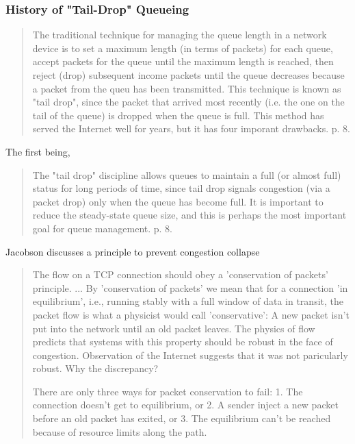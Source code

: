 \subsubsection{History of "Tail-Drop" Queueing}

\begin{quote}
The traditional technique for managing the queue length in a network device is to set a maximum
    length (in terms of packets) for each queue, accept packets for the queue until the maximum
    length is reached, then reject (drop) subsequent income packets until the queue decreases
    because a packet from the queu has been transmitted. This technique is known as "tail drop",
    since the packet that arrived most recently (i.e. the one on the tail of the queue) is dropped
    when the queue is full. This method has served the Internet well for years, but it has four
    imporant drawbacks. \cite{rfc7567} p. 8.
\end{quote}

The first being,

\begin{quote}
The "tail drop" discipline allows queues to maintain a full (or almost full) status for long periods
of time, since tail drop signals congestion (via a packet drop) only when the queue has become
full. It is important to reduce the steady-state queue size, and this is perhaps the most
important goal for queue management. \cite{rfc7567} p. 8.
\end{quote}


Jacobson \cite{jacobson1988} discusses a principle to prevent congestion collapse

\begin{quote}
    The flow on a TCP connection should obey a 'conservation of packets' principle. ... By
    'conservation of packets' we mean that for a connection 'in equilibrium', i.e., running stably
    with a full window of data in transit, the packet flow is what a physicist would call
    'conservative': A new packet isn't put into the network until an old packet leaves. The physics
    of flow predicts that systems with this property should be robust in the face of congestion.
    Observation of the Internet suggests that it was not paricularly robust. Why the discrepancy?

    There are only three ways for packet conservation to fail:
    1. The connection doesn't get to equilibrium, or
    2. A sender inject a new packet before an old packet has exited, or
    3. The equilibrium can't be reached because of resource limits along the path.
\end{quote}

